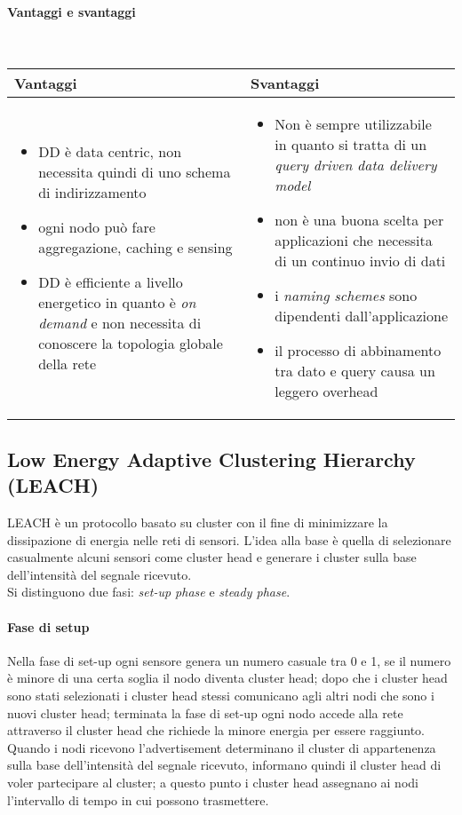 \paragraph{Vantaggi e svantaggi} \mbox{}\\[1ex]
	\begin{tabularx}{\textwidth}{XX}
		\toprule
		Vantaggi & Svantaggi\\
		\midrule
		\begin{itemize}
			\item DD è data centric, non necessita quindi di uno schema di indirizzamento
			\item ogni nodo può fare aggregazione, caching e sensing
			\item DD è efficiente a livello energetico in quanto è \emph{on demand} e non necessita di conoscere la topologia globale della rete
		\end{itemize}
		& \begin{itemize}
			\item Non è sempre utilizzabile in quanto si tratta di un \emph{query driven data delivery model}
			\item non è una buona scelta per applicazioni che necessita di un continuo invio di dati
			\item i \emph{naming schemes} sono dipendenti dall'applicazione
			\item il processo di abbinamento tra dato e query causa un leggero overhead
		\end{itemize}\\
		\bottomrule
	\end{tabularx}


\subsection{Low Energy Adaptive Clustering Hierarchy (LEACH)}
	
	LEACH è un protocollo basato su cluster con il fine di minimizzare la dissipazione di energia nelle reti di sensori.
	L'idea alla base è quella di selezionare casualmente alcuni sensori come cluster head e generare i cluster sulla base dell'intensità del segnale ricevuto.\\
	Si distinguono due fasi: \emph{set-up phase} e \emph{steady phase}.
	
\paragraph{Fase di setup}
	Nella fase di set-up ogni sensore genera un numero casuale tra 0 e 1, se il numero è minore di una certa soglia il nodo diventa cluster head;
	dopo che i cluster head sono stati selezionati i cluster head stessi comunicano agli altri nodi che sono i nuovi cluster head;
	terminata la fase di set-up ogni nodo accede alla rete attraverso il cluster head che richiede la minore energia per essere raggiunto.\\
	Quando i nodi ricevono l'advertisement determinano il cluster di appartenenza sulla base dell'intensità del segnale ricevuto, informano quindi il cluster head di voler partecipare al cluster; a questo punto i cluster head assegnano ai nodi l'intervallo di tempo in cui possono trasmettere.
	
